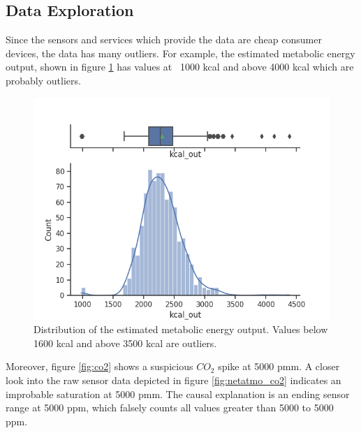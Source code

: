 \documentclass[conference]{IEEEtran}
\begin{document}
\subsection{Data Exploration}
Since the sensors and services which provide the data are cheap consumer devices, the data has many outliers.
For example, the estimated metabolic energy output, shown in figure \ref{fig:kcal_out} has values at ~1000 kcal and above 4000 kcal which are probably outliers.


\begin{figure}[htbp]
\begin{center}
\includegraphics[width=1\linewidth]{figs/kcal_out.png}
\caption{Distribution of the estimated metabolic energy output. Values below 1600 kcal and above 3500 kcal are outliers.}
\label{fig:kcal_out}
\end{center}
\end{figure}

Moreover, figure \ref{fig:co2} shows a suspicious $CO_2$ spike at 5000 pmm. A closer look into the raw sensor data depicted in figure \ref{fig:netatmo_co2} indicates an improbable saturation at 5000 pmm. The causal explanation is an ending sensor range at 5000 ppm, which falsely counts all values greater than 5000 to 5000 ppm.
\end{document}
